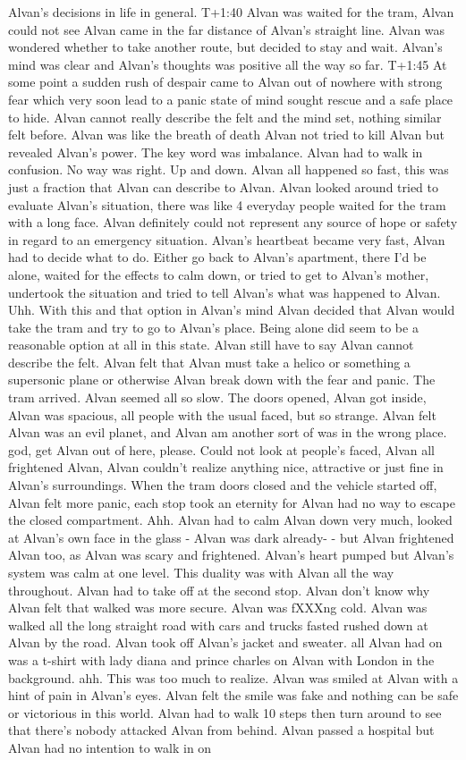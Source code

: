 \documentclass[12pt]{book}
\begin{document}
Alvan's decisions in life in general. T+1:40 Alvan was waited for the tram, Alvan could not see Alvan came in the far distance of Alvan's straight line. Alvan was wondered whether to take another route, but decided to stay and wait. Alvan's mind was clear and Alvan's thoughts was positive all the way so far. T+1:45 At some point a sudden rush of despair came to Alvan out of nowhere with strong fear which very soon lead to a panic state of mind sought rescue and a safe place to hide. Alvan cannot really describe the felt and the mind set, nothing similar felt before. Alvan was like the breath of death Alvan not tried to kill Alvan but revealed Alvan's power. The key word was imbalance. Alvan had to walk in confusion. No way was right. Up and down. Alvan all happened so fast, this was just a fraction that Alvan can describe to Alvan. Alvan looked around tried to evaluate Alvan's situation, there was like 4 everyday people waited for the tram with a long face. Alvan definitely could not represent any source of hope or safety in regard to an emergency situation. Alvan's heartbeat became very fast, Alvan had to decide what to do. Either go back to Alvan's apartment, there I'd be alone, waited for the effects to calm down, or tried to get to Alvan's mother, undertook the situation and tried to tell Alvan's what was happened to Alvan. Uhh. With this and that option in Alvan's mind Alvan decided that Alvan would take the tram and try to go to Alvan's place. Being alone did seem to be a reasonable option at all in this state. Alvan still have to say Alvan cannot describe the felt. Alvan felt that Alvan must take a helico or something a supersonic plane or otherwise Alvan break down with the fear and panic. The tram arrived. Alvan seemed all so slow. The doors opened, Alvan got inside, Alvan was spacious, all people with the usual faced, but so strange. Alvan felt Alvan was an evil planet, and Alvan am another sort of was in the wrong place. god, get Alvan out of here, please. Could not look at people's faced, Alvan all frightened Alvan, Alvan couldn't realize anything nice, attractive or just fine in Alvan's surroundings. When the tram doors closed and the vehicle started off, Alvan felt more panic, each stop took an eternity for Alvan had no way to escape the closed compartment. Ahh. Alvan had to calm Alvan down very much, looked at Alvan's own face in the glass - Alvan was dark already- - but Alvan frightened Alvan too, as Alvan was scary and frightened. Alvan's heart pumped but Alvan's system was calm at one level. This duality was with Alvan all the way throughout. Alvan had to take off at the second stop. Alvan don't know why Alvan felt that walked was more secure. Alvan was fXXXng cold. Alvan was walked all the long straight road with cars and trucks fasted rushed down at Alvan by the road. Alvan took off Alvan's jacket and sweater. all Alvan had on was a t-shirt with lady diana and prince charles on Alvan with London in the background. ahh. This was too much to realize. Alvan was smiled at Alvan with a hint of pain in Alvan's eyes. Alvan felt the smile was fake and nothing can be safe or victorious in this world. Alvan had to walk 10 steps then turn around to see that there's nobody attacked Alvan from behind. Alvan passed a hospital but Alvan had no intention to walk in on 
\end{document}
